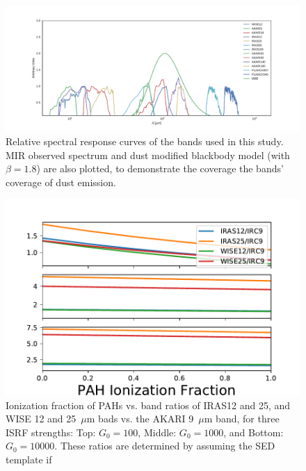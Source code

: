        \begin{figure}
         \centering
         \includegraphics[width=\textwidth]{../Plots/ch_datasources/Filter_coverage_example.pdf}
         \caption{Relative spectral response curves of the bands used in this study. MIR observed spectrum and dust modified blackbody model (with $\beta = 1.8$) are also plotted, to demonstrate the coverage the bands' coverage of dust emission.}
         \label{fig:Filter_coverage_example}
       \end{figure}


       \begin{figure}
           \centering
           \includegraphics[width=150mm]{../Plots/band-ratio-multiple.pdf}
           \caption{Ionization fraction of PAHs vs. band ratios of IRAS12 and 25, and WISE 12 and 25~$\mu$m bads vs. the AKARI 9~$\mu$m band, for three ISRF strengths: Top: $G_{0} = 100$, Middle: $G_{0} = 1000$, and Bottom: $G_{0} = 10000$. These ratios are determined by assuming the SED template if \cite{dustem11} }
           \label{fig:inband_ionfrac_ratios}
       \end{figure}

